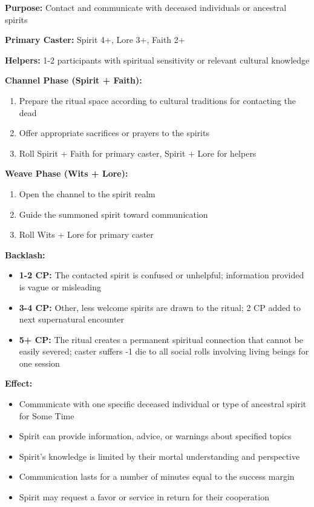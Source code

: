 \documentclass[12pt,twoside]{book}
\begin{document}
\textbf{Purpose:} Contact and communicate with deceased individuals or ancestral spirits

\textbf{Primary Caster:} Spirit 4+, Lore 3+, Faith 2+

\textbf{Helpers:} 1-2 participants with spiritual sensitivity or relevant cultural knowledge

\textbf{Channel Phase (Spirit + Faith):}
\begin{enumerate}
\item Prepare the ritual space according to cultural traditions for contacting the dead
\item Offer appropriate sacrifices or prayers to the spirits
\item Roll Spirit + Faith for primary caster, Spirit + Lore for helpers
\end{enumerate}

\textbf{Weave Phase (Wits + Lore):}
\begin{enumerate}
\item Open the channel to the spirit realm
\item Guide the summoned spirit toward communication
\item Roll Wits + Lore for primary caster
\end{enumerate}

\textbf{Backlash:}
\begin{itemize}
\item \textbf{1-2 CP:} The contacted spirit is confused or unhelpful; information provided is vague or misleading
\item \textbf{3-4 CP:} Other, less welcome spirits are drawn to the ritual; 2 CP added to next supernatural encounter
\item \textbf{5+ CP:} The ritual creates a permanent spiritual connection that cannot be easily severed; caster suffers -1 die to all social rolls involving living beings for one session
\end{itemize}

\textbf{Effect:}
\begin{itemize}
\item Communicate with one specific deceased individual or type of ancestral spirit for Some Time
\item Spirit can provide information, advice, or warnings about specified topics
\item Spirit's knowledge is limited by their mortal understanding and perspective
\item Communication lasts for a number of minutes equal to the success margin
\item Spirit may request a favor or service in return for their cooperation
\end{itemize}
\end{document}
